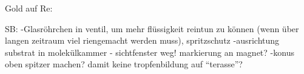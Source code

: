 Gold auf Re:





SB:
-Glasröhrchen in ventil, um mehr flüssigkeit reintun zu können (wenn über langen zeitraum viel riengemacht
werden muss), spritzschutz
-ausrichtung substrat in molekülkammer - sichtfenster weg! markierung an magnet?
-konus oben spitzer machen? damit keine tropfenbildung auf "`terasse"'?